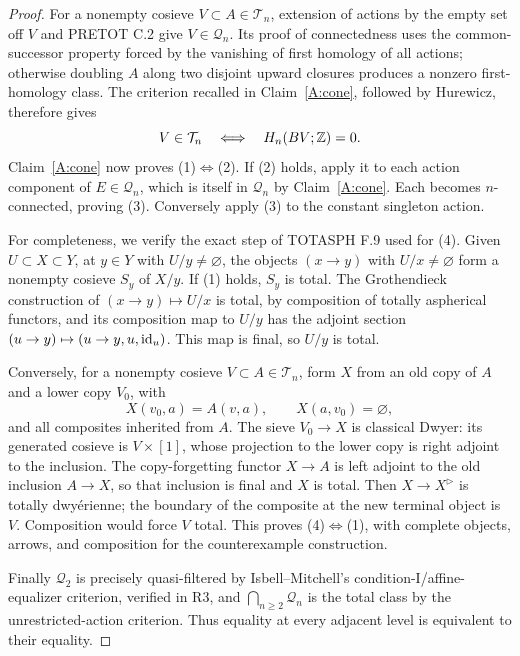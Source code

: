 \begin{proof}
For a nonempty cosieve $V\subset A\in\mathcal T_n$, extension of actions by the empty set off $V$ and PRETOT C.2 give $V\in\mathcal Q_n$. Its proof of connectedness uses the common-successor property forced by the vanishing of first homology of all actions; otherwise doubling $A$ along two disjoint upward closures produces a nonzero first-homology class. The criterion recalled in Claim~\ref{A:cone}, followed by Hurewicz, therefore gives
\[
 V\in\mathcal T_n\quad\Longleftrightarrow\quad H_n(BV;\mathbb Z)=0.
\]
Claim~\ref{A:cone} now proves (1)$\Leftrightarrow$(2). If (2) holds, apply it to each action component of $E\in\mathcal Q_n$, which is itself in $\mathcal Q_n$ by Claim~\ref{A:cone}. Each becomes $n$-connected, proving (3). Conversely apply (3) to the constant singleton action.

For completeness, we verify the exact step of TOTASPH F.9 used for (4). Given $U\subset X\subset Y$, at $y\in Y$ with $U/y\ne\varnothing$, the objects $(x\to y)$ with $U/x\ne\varnothing$ form a nonempty cosieve $S_y$ of $X/y$. If (1) holds, $S_y$ is total. The Grothendieck construction of $(x\to y)\mapsto U/x$ is total, by composition of totally aspherical functors, and its composition map to $U/y$ has the adjoint section $(u\to y)\mapsto(u\to y,u,\mathrm{id}_u)$. This map is final, so $U/y$ is total.

Conversely, for a nonempty cosieve $V\subset A\in\mathcal T_n$, form $X$ from an old copy of $A$ and a lower copy $V_0$, with
\[
 X(v_0,a)=A(v,a),\qquad X(a,v_0)=\varnothing,
\]
and all composites inherited from $A$. The sieve $V_0\to X$ is classical Dwyer: its generated cosieve is $V\times[1]$, whose projection to the lower copy is right adjoint to the inclusion. The copy-forgetting functor $X\to A$ is left adjoint to the old inclusion $A\to X$, so that inclusion is final and $X$ is total. Then $X\to X^{\triangleright}$ is totally dwy\'erienne; the boundary of the composite at the new terminal object is $V$. Composition would force $V$ total. This proves (4)$\Leftrightarrow$(1), with complete objects, arrows, and composition for the counterexample construction.

Finally $\mathcal Q_2$ is precisely quasi-filtered by Isbell--Mitchell's condition-I/affine-equalizer criterion, verified in R3, and $\bigcap_{n\geq2}\mathcal Q_n$ is the total class by the unrestricted-action criterion. Thus equality at every adjacent level is equivalent to their equality.


\end{proof}
